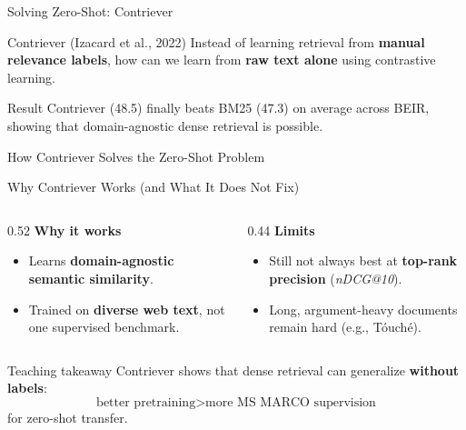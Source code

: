 \documentclass[aspectratio=169]{beamer}
\newif\ifanimated
\newcommand{\cpause}{\ifanimated\pause\fi}
\begin{document}
\begin{frame}{Solving Zero-Shot: Contriever}
\begin{block}{Contriever (Izacard et al., 2022)}
Instead of learning retrieval from \textbf{manual relevance labels},
how can we learn from \textbf{raw text alone} using contrastive learning.
\end{block}

\vspace{1em}
\cpause

\begin{exampleblock}{Result}
Contriever (48.5) finally beats BM25 (47.3) on average across BEIR, showing that domain-agnostic dense retrieval is possible.
\end{exampleblock}
\end{frame}

\begin{frame}[shrink=15]{How Contriever Solves the Zero-Shot Problem}
\begin{center}

\end{center}
\end{frame}

\begin{frame}{Why Contriever Works (and What It Does Not Fix)}
\begin{columns}[T]
\begin{column}{0.52\textwidth}
\textbf{Why it works}
\begin{itemize}
    \item Learns \textbf{domain-agnostic semantic similarity}.
    \item Trained on \textbf{diverse web text}, not one supervised benchmark.
\end{itemize}
\end{column}

\begin{column}{0.44\textwidth}
\textbf{Limits}
\begin{itemize}
    \item Still not always best at \textbf{top-rank precision} (\textit{nDCG@10}).
    \item Long, argument-heavy documents remain hard (e.g., T{\'o}uch{\'e}).
\end{itemize}
\end{column}
\end{columns}

\vspace{0.8em}
\cpause

\begin{exampleblock}{Teaching takeaway}
Contriever shows that dense retrieval can generalize \textbf{without labels}:
\[
\text{better pretraining} > \text{more MS MARCO supervision}
\]
for zero-shot transfer.
\end{exampleblock}
\end{frame}
\end{document}
